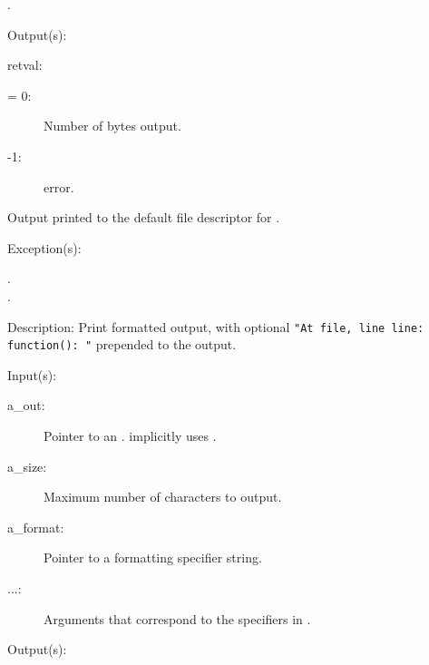 \begin{capi}
\begin{capilist}
\begin{description}
			.
		\end{description}
	\item[Output(s): ]
		\item[retval: ]
			\begin{description}\item[]
			\item[{\gt}= 0: ]
				Number of bytes output.
			\item[-1: ]
				 error.
			\end{description}
		\item{Output printed to the default file descriptor for
			.}
	\item[Exception(s): ]
		\begin{description}\item[]
		\item[.]
		\item[.]
		\end{description}
	\item[Description: ]
		Print formatted output, with optional {\tt "At {\lt}file{\gt},
		line {\lt}line{\gt}: {\lt}function{\gt}(): "} prepended to the
		output.
	\end{capilist}
\label{out_put_n}
\label{_cw_out_put_n}
	\begin{capilist}
	\item[Input(s): ]
		\begin{description}\item[]
		\item[a\_out: ]
			Pointer to an .
			 implicitly uses
			.
		\item[a\_size: ]
			Maximum number of characters to output.
		\item[a\_format: ]
			Pointer to a formatting specifier string.
		\item[...: ]
			Arguments that correspond to the specifiers in
			.
		\end{description}
	\item[Output(s): ]
		\begin{description}\item[]

\end{description}
\end{capilist}
\end{capi}
